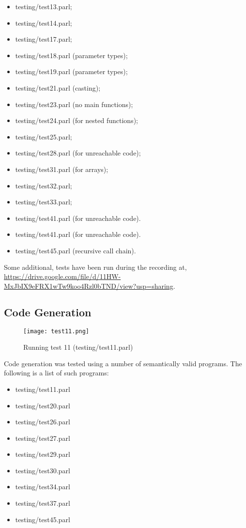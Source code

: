 \begin{itemize}
    \item testing/test13.parl;
    \item testing/test14.parl;
    \item testing/test17.parl;
    \item testing/test18.parl (parameter types);
    \item testing/test19.parl (parameter types);
    \item testing/test21.parl (casting);
    \item testing/test23.parl (no main functions);
    \item testing/test24.parl (for nested functions);
    \item testing/test25.parl;
    \item testing/test28.parl (for unreachable code);
    \item testing/test31.parl (for arrays);
    \item testing/test32.parl;
    \item testing/test33.parl;
    \item testing/test41.parl (for unreachable code).
    \item testing/test41.parl (for unreachable code).
    \item testing/test45.parl (recursive call chain).
\end{itemize}

Some additional, tests have been run during the recording at,
\url{https://drive.google.com/file/d/11HW-MxJbIX9eFRX1wTw9koo4Rzl0bTND/view?usp=sharing}.

\subsection{Code Generation}

\begin{figure}[H]
\centering
\texttt{[image: test11.png]}
\caption{Running test 11 (testing/test11.parl)}
\end{figure}

Code generation was tested using a number of semantically valid
programs. The following is a list of such programs:

\begin{itemize}
    \item testing/test11.parl
    \item testing/test20.parl
    \item testing/test26.parl
    \item testing/test27.parl
    \item testing/test29.parl
    \item testing/test30.parl
    \item testing/test34.parl
    \item testing/test37.parl
    \item testing/test45.parl
\end{itemize}

